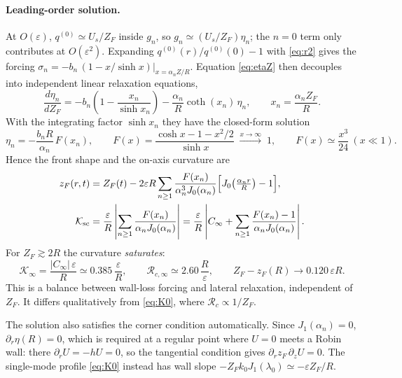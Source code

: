 \documentclass[11pt]{article}
\numberwithin{equation}{section}
\begin{document}
\paragraph{Leading-order solution.} At $O(\varepsilon)$, $q^{(0)}\simeq U_s/Z_F$ inside $g_n$, so $g_n\simeq(U_s/Z_F)\eta_n$; the $n=0$ term only contributes at $O(\varepsilon^2)$. Expanding $q^{(0)}(r)/q^{(0)}(0)-1$ with \eqref{eq:r2} gives the forcing $\sigma_n=-b_n\,(1-x/\sinh x)|_{x=\alpha_nZ/R}$. Equation \eqref{eq:etaZ} then decouples into independent linear relaxation equations,
\begin{equation}\frac{d\eta_n}{dZ_F}=-b_n\left(1-\frac{x_n}{\sinh x_n}\right)-\frac{\alpha_n}{R}\coth(x_n)\,\eta_n,\qquad x_n=\frac{\alpha_nZ_F}{R}.\end{equation}
With the integrating factor $\sinh x_n$ they have the closed-form solution
\begin{equation}\eta_n=-\frac{b_nR}{\alpha_n}\,F(x_n),\qquad F(x)=\frac{\cosh x-1-x^2/2}{\sinh x}\;\xrightarrow{x\to\infty}\;1,\qquad F(x)\simeq\frac{x^3}{24}\ (x\ll1).\end{equation}
Hence the front shape and the on-axis curvature are
\begin{align}
z_F(r,t)&=Z_F(t)-2\varepsilon R\sum_{n\ge1}\frac{F(x_n)}{\alpha_n^3J_0(\alpha_n)}\Bigl[J_0\!\left(\tfrac{\alpha_nr}{R}\right)-1\Bigr],\label{eq:shape_sc}\\
\mathcal K_{\rm sc}&=\frac{\varepsilon}{R}\left|\sum_{n\ge1}\frac{F(x_n)}{\alpha_nJ_0(\alpha_n)}\right|
=\frac{\varepsilon}{R}\left|C_\infty+\sum_{n\ge1}\frac{F(x_n)-1}{\alpha_nJ_0(\alpha_n)}\right|.\label{eq:Ksc}
\end{align}
For $Z_F\gtrsim2R$ the curvature \emph{saturates}:
\begin{equation}\boxed{\mathcal K_\infty=\frac{|C_\infty|\,\varepsilon}{R}\simeq0.385\,\frac{\varepsilon}{R},\qquad \mathcal R_{c,\infty}\simeq2.60\,\frac{R}{\varepsilon},\qquad Z_F-z_F(R)\to0.120\,\varepsilon R.}\end{equation}
This is a balance between wall-loss forcing and lateral relaxation, independent of $Z_F$. It differs qualitatively from \eqref{eq:K0}, where $\mathcal R_c\propto1/Z_F$.

The solution also satisfies the corner condition automatically. Since $J_1(\alpha_n)=0$, $\partial_r\eta(R)=0$, which is required at a regular point where $U=0$ meets a Robin wall: there $\partial_rU=-hU=0$, so the tangential condition gives $\partial_rz_F\,\partial_zU=0$. The single-mode profile \eqref{eq:K0} instead has wall slope $-Z_Fk_0J_1(\lambda_0)\simeq-\varepsilon Z_F/R$.
\end{document}
